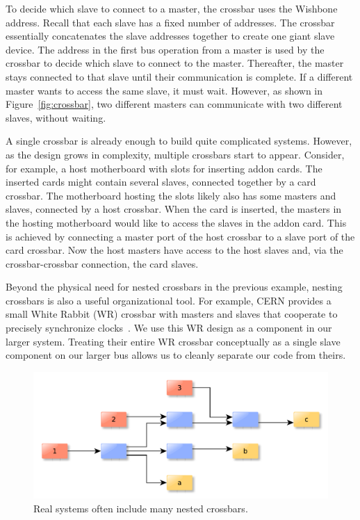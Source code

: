 \documentclass[a4paper]{jacow}
\begin{document}
To decide which slave to connect to a master, the crossbar uses the Wishbone address.
Recall that each slave has a fixed number of addresses.
The crossbar essentially concatenates the slave addresses together to create
one giant slave device.
The address in the first bus operation from a master is used by the crossbar
to decide which slave to connect to the master.
Thereafter, the master stays connected to that slave until their
communication is complete.
If a different master wants to access the same slave, it must wait.
However, as shown in Figure~\ref{fig:crossbar}, two different masters can
communicate with two different slaves, without waiting.

A single crossbar is already enough to build quite complicated systems.
However, as the design grows in complexity, multiple crossbars start to appear.
Consider, for example, a host motherboard with slots for inserting addon cards.
The inserted cards might contain several slaves, connected together by a card crossbar.
The motherboard hosting the slots likely also has some masters and slaves, 
connected by a host crossbar.
When the card is inserted, the masters in the hosting motherboard 
would like to access the slaves in the addon card.
This is achieved by connecting a master port of the host crossbar 
to a slave port of the card crossbar.
Now the host masters have access to the host slaves and, via the
crossbar-crossbar connection, the card slaves.

Beyond the physical need for nested crossbars in the previous example,
nesting crossbars is also a useful organizational tool.
For example, CERN provides a small White Rabbit (WR) crossbar with masters
and slaves that cooperate to precisely synchronize clocks~\cite{wr}.
We use this WR design as a component in our larger system.
Treating their entire WR crossbar conceptually as a single slave component on
our larger bus allows us to cleanly separate our code from theirs.

\begin{figure}[t]
  \centering
  \includegraphics*[width=\columnwidth]{THHA2O03f3}
  \caption{Real systems often include many nested crossbars.}
  \label{fig:complex-bus}
\end{figure}
\end{document}
